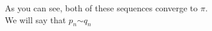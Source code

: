 \documentclass[preview]{standalone}
\begin{document}
\begin{center}
As you can see, both of these sequences converge to $\pi$.\\We will say that $p_n$$\sim$$q_n$
\end{center}
\end{document}
